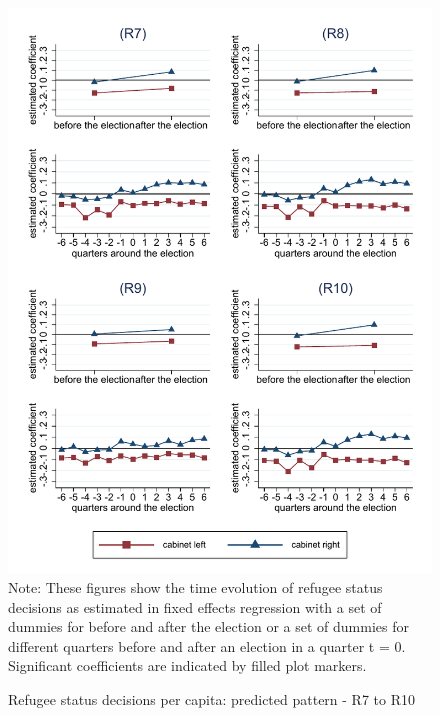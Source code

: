 \documentclass[11pt,a4paper]{scrartcl}
\begin{document}
\clearpage
\FloatBarrier
\begin{figure}[!ht]
	\caption{Refugee status decisions per capita: predicted pattern - R7 to R10}
	\includegraphics[width=1\textwidth]{../results/decisions/log_refugeestatus_pc_graphs_R7-R10.pdf}
	\scriptsize{Note: These figures show the time evolution of refugee status decisions as estimated in fixed effects regression with a set of dummies for before and after the election or a set of dummies for different quarters before and after an election in a quarter t = 0. Significant coefficients are indicated by filled plot markers.}
\end{figure}




\clearpage
\FloatBarrier

\end{document}
